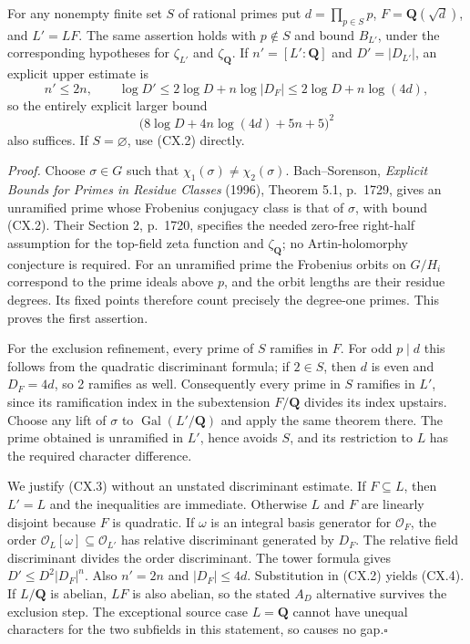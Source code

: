 For any nonempty finite set $S$ of rational primes put
$d=\prod_{p\in S}p$, $F=\mathbf Q(\sqrt d)$, and $L'=LF$.
The same assertion holds with $p\notin S$ and bound $B_{L'}$, under the
corresponding hypotheses for $\zeta_{L'}$ and $\zeta_{\mathbf Q}$.
If $n'=[L':\mathbf Q]$ and $D'=|D_{L'}|$, an explicit upper estimate is
\[
 n'\leq2n,\qquad \log D'\leq2\log D+n\log|D_F|
                     \leq2\log D+n\log(4d),               \tag{CX.3}
\]
so the entirely explicit larger bound
\[
        \bigl(8\log D+4n\log(4d)+5n+5\bigr)^2            \tag{CX.4}
\]
also suffices. If $S=\varnothing$, use (CX.2) directly.

\emph{Proof.} Choose $\sigma\in G$ such that
$\chi_1(\sigma)\ne\chi_2(\sigma)$. Bach--Sorenson,
\emph{Explicit Bounds for Primes in Residue Classes} (1996), Theorem 5.1,
p.~1729, gives an unramified prime whose Frobenius conjugacy class is that
of $\sigma$, with bound (CX.2). Their Section 2, p.~1720, specifies the
needed zero-free right-half assumption for the top-field zeta function and
$\zeta_{\mathbf Q}$; no Artin-holomorphy conjecture is required.
For an unramified prime the Frobenius orbits on $G/H_i$ correspond to the
prime ideals above $p$, and the orbit lengths are their residue degrees.
Its fixed points therefore count precisely the degree-one primes.
This proves the first assertion.

For the exclusion refinement, every prime of $S$ ramifies in $F$. For odd
$p\mid d$ this follows from the quadratic discriminant formula; if $2\in S$,
then $d$ is even and $D_F=4d$, so 2 ramifies as well. Consequently every
prime in $S$ ramifies in $L'$, since its ramification index in the subextension
$F/\mathbf Q$ divides its index upstairs. Choose any lift of $\sigma$ to
$\operatorname{Gal}(L'/\mathbf Q)$ and apply the same theorem there. The
prime obtained is unramified in $L'$, hence avoids $S$, and its restriction
to $L$ has the required character difference.

We justify (CX.3) without an unstated discriminant estimate. If $F\subseteq L$,
then $L'=L$ and the inequalities are immediate. Otherwise $L$ and $F$ are
linearly disjoint because $F$ is quadratic. If $\omega$ is an integral basis
generator for $\mathcal O_F$, the order $\mathcal O_L[\omega]\subseteq
\mathcal O_{L'}$ has relative discriminant generated by $D_F$. The relative
field discriminant divides the order discriminant. The tower formula gives
$D'\leq D^2|D_F|^n$. Also $n'=2n$ and $|D_F|\leq4d$.
Substitution in (CX.2) yields (CX.4). If $L/\mathbf Q$ is abelian, $LF$ is
also abelian, so the stated $A_D$ alternative survives the exclusion step.
The exceptional source case $L=\mathbf Q$ cannot have unequal characters
for the two subfields in this statement, so causes no gap.\hfill$\square$

